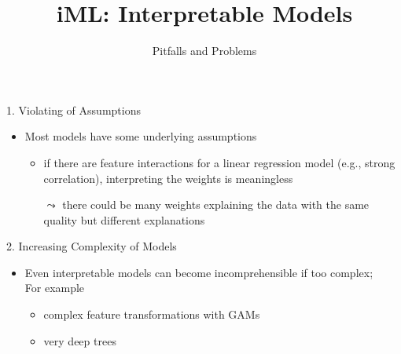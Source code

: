 \documentclass[aspectratio=169]{../latex_main/tntbeamer}  %
\title[Introduction]{iML: Interpretable Models}
\subtitle{Pitfalls and Problems}
\begin{document}
	
	\maketitle

    
    \begin{frame}[c]{1. Violating of Assumptions}
    
        \begin{itemize}
            \item Most models have some underlying assumptions
            \begin{itemize}
                \item if there are feature interactions for a linear regression model (e.g., strong correlation), interpreting the weights is meaningless
                \item[$\leadsto$] there could be many weights explaining the data with the same quality but different explanations
            \end{itemize}
        \end{itemize}
    
    \end{frame}
    
    
    \begin{frame}[c]{2. Increasing Complexity of Models}
    
        \begin{itemize}
            \item Even interpretable models can become incomprehensible if too complex;\\
            For example
            \begin{itemize}
                \item complex feature transformations with GAMs
                \item very deep trees
            \end{itemize}
            
        \end{itemize}
    
    \end{frame}
    
    
\end{document}
